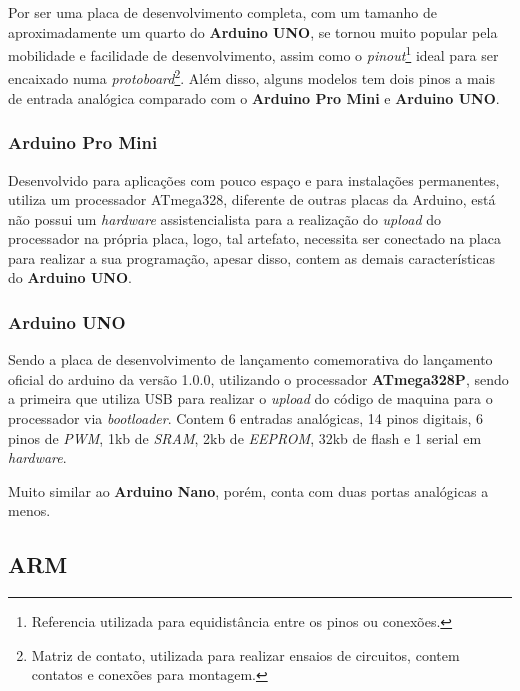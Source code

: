 Por ser uma placa de desenvolvimento completa, com um tamanho de aproximadamente um quarto do \textbf{Arduino UNO}, se tornou muito popular pela mobilidade e facilidade de desenvolvimento, assim como o \textit{pinout}\footnote{ Referencia utilizada para equidistância entre os pinos ou conexões.} ideal para ser encaixado numa \textit{protoboard}\footnote{Matriz de contato, utilizada para realizar ensaios de circuitos, contem contatos e conexões para montagem.}. Além disso, alguns modelos tem dois pinos a mais de entrada analógica comparado com o \textbf{Arduino Pro Mini} e \textbf{Arduino UNO}.

\subsubsection{Arduino Pro Mini}

Desenvolvido para aplicações com pouco espaço e para instalações permanentes, utiliza um processador ATmega328,  diferente de outras placas da Arduino, está não possui um \textit{hardware} assistencialista para a realização do \textit{upload} do processador na própria placa, logo, tal artefato, necessita ser conectado na placa para realizar a sua programação, apesar disso, contem as demais características do \textbf{Arduino UNO}.

\subsubsection{Arduino UNO}

Sendo a placa de desenvolvimento de lançamento comemorativa do lançamento oficial do arduino da versão 1.0.0, utilizando o processador \textbf{ATmega328P}, sendo a primeira que utiliza USB para realizar o \textit{upload} do código de maquina para o processador via \textit{bootloader}. Contem 6 entradas analógicas, 14 pinos digitais, 6 pinos de \textit{PWM}, 1kb de \textit{SRAM}, 2kb de \textit{EEPROM}, 32kb de flash e 1 serial em \textit{hardware}.

Muito similar ao \textbf{Arduino Nano}, porém, conta com duas portas analógicas a menos.


\subsection{ARM}

